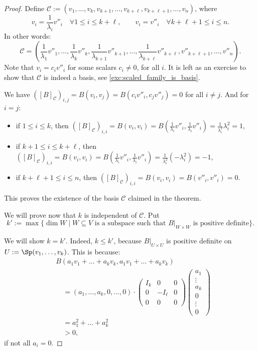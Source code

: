 \begin{proof}
Define $\mathcal{C} := (v_1, \dots, v_k, v_{k+1}, \dots, v_{k+\ell}, v_{k+\ell+1}, \dots, v_n)$, where 
\[
v_i = \frac{1}{\lambda_i} v''_i \quad \forall 1 \le i \le k+\ell, \qquad v_i = v''_i \quad \forall k+\ell+1 \le i \le n.
\]
In other words: 
\[
\mathcal{C} = \left(\frac{1}{\lambda_1} v''_1, \dots, \frac{1}{\lambda_k} v''_k, \frac{1}{\lambda_{k+1}} v''_{k+1}, \dots, \frac{1}{\lambda_{k+\ell}} v''_{k+\ell}, v''_{k+\ell+1}, \dots, v''_n\right).
\]
Note that $v_i = c_i v''_i$ for some scalars $c_i \neq 0$, for all $i$. It is left as an exercise to show that $\mathcal{C}$ is indeed a basis, see \cref{exc:scaled_family_is_basis}.

We have $([B]_{\mathcal{C}})_{i,j} = B(v_i, v_j) = B(c_i v''_i, c_j v''_j) = 0$ for all $i \neq j$.
\noindent
And for $i = j$:
\begin{itemize}
    \item if $1 \le i \le k$, then $([B]_{\mathcal{C}})_{i,i} = B(v_i, v_i) = B\left(\frac{1}{\lambda_i} v''_i, \frac{1}{\lambda_i} v''_i\right) = \frac{1}{\lambda_i^2} \lambda_i^2 = 1$,
    \item if $k+1 \le i \le k+\ell$, then $([B]_{\mathcal{C}})_{i,i} = B(v_i, v_i) = B\left(\frac{1}{\lambda_i} v''_i, \frac{1}{\lambda_i} v''_i\right) = \frac{1}{\lambda_i^2} (-\lambda_i^2) = -1$,
    \item if $k+\ell+1 \le i \le n$, then $([B]_{\mathcal{C}})_{i,i} = B(v_i, v_i) = B(v''_i, v''_i) = 0$.
\end{itemize}
This proves the existence of the basis $\mathcal{C}$ claimed in the theorem.

We will prove now that $k$ is independent of $\mathcal{C}$. Put 
\[
k' := \max \{ \dim W \mid W \subseteq V \text{ is a subspace such that } B|_{W \times W} \text{ is positive definite} \}.
\]

We will show $k = k'$. Indeed, $k \le k'$, because $B|_{U \times U}$ is positive definite on $U := \Sp(v_1, \dots, v_k)$. This is because:
\begin{align*}
    & B(a_1 v_1 + \dots + a_k v_k, a_1 v_1 + \dots + a_k v_k) \\
    & \quad = (a_1, \dots, a_k, 0, \dots, 0) \cdot \begin{pmatrix} I_k & 0 & 0 \\ 0 & -I_\ell & 0 \\ 0 & 0 & 0 \end{pmatrix} \begin{pmatrix} a_1 \\ \vdots \\ a_k \\ 0 \\ \vdots \\ 0 \end{pmatrix} \\
    & \quad = a_1^2 + \dots + a_k^2 \\
    & \quad > 0,
\end{align*}
if not all $a_i = 0$.


\end{proof}
